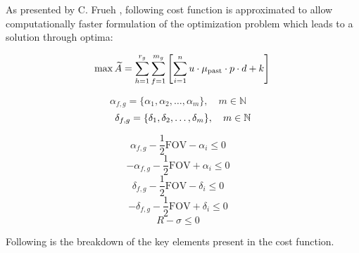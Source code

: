 As presented by C. Frueh \cite{fruh3}, following cost function is approximated to allow computationally faster formulation of the optimization problem which leads to a solution through optima:

\begin{equation}
	\max\widetilde{A} = \sum_{h=1}^{r_g} \sum_{f=1}^{m_g} \left[ \sum_{i=1}^{n} u \cdot \mu_{\text{past}} \cdot p \cdot d + k \right] \quad	\\
\end{equation}

\begin{equation}
	\alpha_{f, g} = \{\alpha_1, \alpha_2, \ldots, \alpha_m\}, \quad m \in \mathbb{N} \quad 
\end{equation}
\begin{equation}
	\delta_{f, g} = \{\delta_1, \delta_2, \ldots, \delta_m\}, \quad m \in \mathbb{N} \quad\\
\end{equation}

\begin{equation}
	\alpha_{f, g} - \frac{1}{2} \text{FOV} - \alpha_i \leq 0 \quad
\end{equation}
\begin{equation}
	-\alpha_{f, g} - \frac{1}{2} \text{FOV} + \alpha_i \leq 0 \quad
\end{equation}
\begin{equation}
	\delta_{f, g} - \frac{1}{2} \text{FOV} - \delta_i \leq 0 \quad
\end{equation}
\begin{equation}
	-\delta_{f, g} - \frac{1}{2} \text{FOV} + \delta_i \leq 0 \quad
\end{equation}
\begin{equation}
	R - \sigma \leq 0 \quad
\end{equation}


Following is the breakdown of the key elements present in the cost function.

